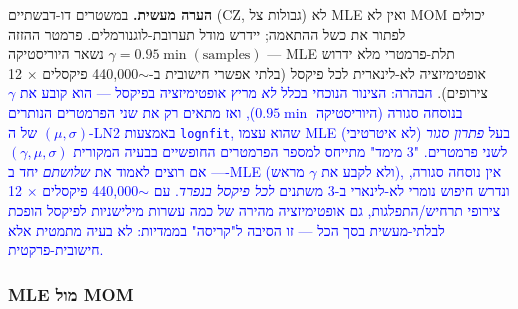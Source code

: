 \documentclass[12pt,a4paper]{article}
\DeclareRobustCommand{\aiedit}[1]{\textcolor{blue}{#1}}
\begin{document}
\textbf{הערה מעשית.} במשטרים דו-דבשתיים (\textenglish{CZ}, גבולות צל)  לא \textenglish{MLE}
ואין לא \textenglish{MOM} יכולים לפתור את כשל ההתאמה; יידרש מודל תערובת-לוגנורמלים.
פרמטר ההזזה $\gamma = 0.95\min(\mathrm{samples})$ נשאר היוריסטיקה ---
\textenglish{MLE} תלת-פרמטרי מלא ידרוש אופטימיזציה לא-לינארית לכל פיקסל
(בלתי אפשרי חישובית ב-$\sim$440{,}000 פיקסלים $\times$ 12 צירופים).
\aiedit{הבהרה: הצינור הנוכחי בכלל \emph{לא} מריץ אופטימיזציה בפיקסל — הוא קובע את $\gamma$
בנוסחה סגורה (היוריסטיקה $0.95\min$), ואז מתאים רק את שני הפרמטרים הנותרים $(\mu,\sigma)$
של ה-LN2 באמצעות \texttt{lognfit}, שהוא עצמו MLE בעל \emph{פתרון סגור} (לא איטרטיבי) לשני
פרמטרים. "3 מימד" מתייחס למספר הפרמטרים החופשיים בבעיה המקורית $(\gamma,\mu,\sigma)$ —
אם רוצים לאמוד את \emph{שלושתם} יחד ב-MLE (ולא לקבע את $\gamma$ מראש), אין נוסחה סגורה,
ונדרש חיפוש נומרי לא-לינארי ב-3 משתנים \emph{לכל פיקסל בנפרד}. עם $\sim$440{,}000 פיקסלים
$\times$ 12 צירופי תרחיש/התפלגות, גם אופטימיזציה מהירה של כמה עשרות מילישניות לפיקסל
הופכת לבלתי-מעשית בסך הכל — זו הסיבה ל"קריסה" בממדיות: לא בעיה מתמטית אלא חישובית-פרקטית.}
\subsubsection{MLE מול MOM}
\label{sec:mle_vs_mom}
\end{document}

